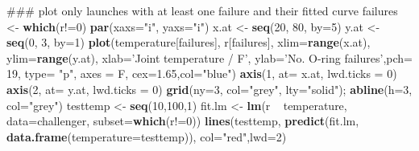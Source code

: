 \documentclass[]{article}
\newenvironment{Shaded}{\begin{snugshade}}{\end{snugshade}}
\newcommand{\KeywordTok}[1]{\textcolor[rgb]{0.13,0.29,0.53}{\textbf{{#1}}}}
\newcommand{\DataTypeTok}[1]{\textcolor[rgb]{0.13,0.29,0.53}{{#1}}}
\newcommand{\DecValTok}[1]{\textcolor[rgb]{0.00,0.00,0.81}{{#1}}}
\newcommand{\FloatTok}[1]{\textcolor[rgb]{0.00,0.00,0.81}{{#1}}}
\newcommand{\StringTok}[1]{\textcolor[rgb]{0.31,0.60,0.02}{{#1}}}
\newcommand{\NormalTok}[1]{{#1}}
\numberwithin{equation}{section}
\begin{document}
\begin{Shaded}
\begin{Highlighting}[]
\NormalTok{### plot only launches with at least one failure and their fitted curve}
\NormalTok{failures <-}\StringTok{ }\KeywordTok{which}\NormalTok{(r!=}\DecValTok{0}\NormalTok{)}
\KeywordTok{par}\NormalTok{(}\DataTypeTok{xaxs=}\StringTok{"i"}\NormalTok{, }\DataTypeTok{yaxs=}\StringTok{"i"}\NormalTok{)}
\NormalTok{x.at <-}\StringTok{ }\KeywordTok{seq}\NormalTok{(}\DecValTok{20}\NormalTok{, }\DecValTok{80}\NormalTok{, }\DataTypeTok{by=}\DecValTok{5}\NormalTok{)}
\NormalTok{y.at <-}\StringTok{ }\KeywordTok{seq}\NormalTok{(}\DecValTok{0}\NormalTok{, }\DecValTok{3}\NormalTok{, }\DataTypeTok{by=}\DecValTok{1}\NormalTok{)}
\KeywordTok{plot}\NormalTok{(temperature[failures], r[failures], }\DataTypeTok{xlim=}\KeywordTok{range}\NormalTok{(x.at), }\DataTypeTok{ylim=}\KeywordTok{range}\NormalTok{(y.at),}
     \DataTypeTok{xlab=}\StringTok{'Joint temperature / F'}\NormalTok{, }\DataTypeTok{ylab=}\StringTok{'No. O-ring failures'}\NormalTok{,}\DataTypeTok{pch=} \DecValTok{19}\NormalTok{,}
     \DataTypeTok{type=} \StringTok{"p"}\NormalTok{, }\DataTypeTok{axes =} \NormalTok{F, }\DataTypeTok{cex=}\FloatTok{1.65}\NormalTok{,}\DataTypeTok{col=}\StringTok{"blue"}\NormalTok{)}
\KeywordTok{axis}\NormalTok{(}\DecValTok{1}\NormalTok{, }\DataTypeTok{at=} \NormalTok{x.at, }\DataTypeTok{lwd.ticks =} \DecValTok{0}\NormalTok{)}
\KeywordTok{axis}\NormalTok{(}\DecValTok{2}\NormalTok{, }\DataTypeTok{at=} \NormalTok{y.at, }\DataTypeTok{lwd.ticks =} \DecValTok{0}\NormalTok{)}
\KeywordTok{grid}\NormalTok{(}\DataTypeTok{ny=}\DecValTok{3}\NormalTok{, }\DataTypeTok{col=}\StringTok{"grey"}\NormalTok{, }\DataTypeTok{lty=}\StringTok{"solid"}\NormalTok{);}
\KeywordTok{abline}\NormalTok{(}\DataTypeTok{h=}\DecValTok{3}\NormalTok{, }\DataTypeTok{col=}\StringTok{"grey"}\NormalTok{)}
\NormalTok{testtemp <-}\StringTok{ }\KeywordTok{seq}\NormalTok{(}\DecValTok{10}\NormalTok{,}\DecValTok{100}\NormalTok{,}\DecValTok{1}\NormalTok{)}
\NormalTok{fit.lm <-}\StringTok{ }\KeywordTok{lm}\NormalTok{(r ~}\StringTok{ }\NormalTok{temperature, }\DataTypeTok{data=}\NormalTok{challenger, }\DataTypeTok{subset=}\KeywordTok{which}\NormalTok{(r!=}\DecValTok{0}\NormalTok{))}
\KeywordTok{lines}\NormalTok{(testtemp, }\KeywordTok{predict}\NormalTok{(fit.lm, }\KeywordTok{data.frame}\NormalTok{(}\DataTypeTok{temperature=}\NormalTok{testtemp)),}
      \DataTypeTok{col=}\StringTok{"red"}\NormalTok{,}\DataTypeTok{lwd=}\DecValTok{2}\NormalTok{)}
\end{Highlighting}
\end{Shaded}
\end{document}
